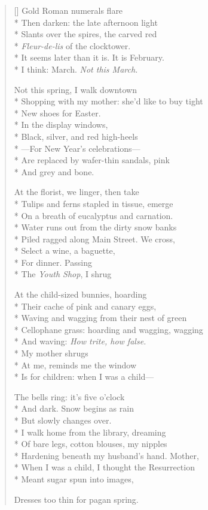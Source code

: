 \label{ch:requiescat}
\settowidth{\versewidth}{Shopping with my mother: she'd like to buy tight}
\begin{verse}[\versewidth]
Gold Roman numerals flare\\*
Then darken: the late afternoon light\\*
Slants over the spires, the carved red\\*
\textit{Fleur-de-lis} of the clocktower.\\*
It seems later than it is. It is February.\\*
I think: March. \textit{Not this March.}

Not this spring, I walk downtown\\*
Shopping with my mother: she'd like to buy tight\\*
New shoes for Easter.\\*
In the display windows,\\*
Black, silver, and red high-heels\\*
---For New Year's celebrations---\\*
Are replaced by wafer-thin sandals, pink\\*
And grey and bone.

At the florist, we linger, then take\\*
Tulips and ferns stapled in tissue, emerge\\*
On a breath of eucalyptus and carnation.\\*
Water runs out from the dirty snow banks\\*
Piled ragged along Main Street. \qquad We cross,\\*
Select a wine, a baguette,\\*
For dinner. \qquad Passing\\*
The \textit{Youth Shop}, I shrug

At the child-sized bunnies, hoarding\\*
Their cache of pink and canary eggs,\\*
Waving and wagging from their nest of green\\*
Cellophane grass: hoarding and wagging, wagging\\*
And waving: \textit{How trite, how false.}\\*
My mother shrugs\\*
At me, reminds me the window\\*
Is for children: when I was a child---

The bells ring: it's five o'clock\\*
And dark. Snow begins as rain\\*
But slowly changes over.\\*
I walk home from the library, dreaming\\*
Of bare legs, cotton blouses, my nipples\\*
Hardening beneath my husband's hand. Mother,\\*
When I was a child, I thought the Resurrection\\*
Meant sugar spun into images,

Dresses too thin for pagan spring.
\end{verse}
